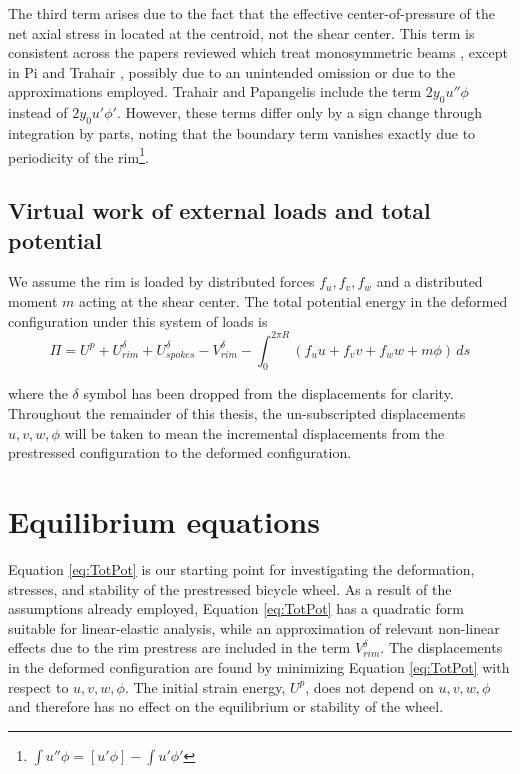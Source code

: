 \documentclass[\rootdir/thesis.tex]{subfiles}
\begin{document}
The third term arises due to the fact that the effective center-of-pressure of the net axial stress in located at the centroid, not the shear center. This term is consistent across the papers reviewed which treat monosymmetric beams \cite{Pi1995,Pi1992,Ryu2012,Trahair1987}, except in Pi and Trahair \cite{Pi1992}, possibly due to an unintended omission or due to the approximations employed. Trahair and Papangelis include the term $2y_0u''\phi$ instead of $2y_0u'\phi'$. However, these terms differ only by a sign change through integration by parts, noting that the boundary term vanishes exactly due to periodicity of the rim\footnote{$\int u''\phi = [u'\phi] - \int u'\phi'$}.


\subsection{Virtual work of external loads and total potential}

We assume the rim is loaded by distributed forces $f_u,f_v,f_w$ and a distributed moment $m$ acting at the shear center. The total potential energy in the deformed configuration under this system of loads is
\begin{equation}
\label{eq:TotPot}
\Pi = U^p + U_{rim}^{\delta} + U_{spokes}^{\delta} - V_{rim}^{\delta} - \int_0^{2\pi R} (f_uu+f_vv+f_ww+m\phi)\, ds
\end{equation}

where the $\delta$ symbol has been dropped from the displacements for clarity. Throughout the remainder of this thesis, the un-subscripted displacements $u,v,w,\phi$ will be taken to mean the incremental displacements from the prestressed configuration to the deformed configuration.

\section{Equilibrium equations}

Equation \eqref{eq:TotPot} is our starting point for investigating the deformation, stresses, and stability of the prestressed bicycle wheel. As a result of the assumptions already employed, Equation \eqref{eq:TotPot} has a quadratic form suitable for linear-elastic analysis, while an approximation of relevant non-linear effects due to the rim prestress are included in the term $V_{rim}^{\delta}$. The displacements in the deformed configuration are found by minimizing Equation \eqref{eq:TotPot} with respect to $u,v,w,\phi$. The initial strain energy, $U^p$, does not depend on $u,v,w,\phi$ and therefore has no effect on the equilibrium or stability of the wheel.
\end{document}
